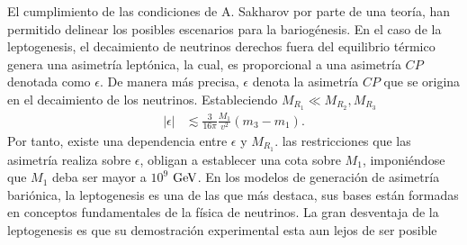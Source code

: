 El cumplimiento de las condiciones de A. Sakharov por parte de una teoría, han permitido delinear los posibles escenarios para la bariogénesis. En el caso de la leptogenesis, el decaimiento de neutrinos derechos fuera del equilibrio térmico genera una asimetría leptónica, la cual, es proporcional a una asimetría $CP$ denotada como $\epsilon$. De manera más precisa, $\epsilon$ denota la asimetría $CP$ que se origina en el decaimiento de los neutrinos.
%
% 
% 
%
Estableciendo $M_{R_{1}}\ll M_{R_{2}},M_{R_{3}}$ 
\begin{align}
|\epsilon|&\lesssim\frac{3}{16\pi}\frac{M_{1}}{v^2}(m_{3}-m_{1}).
\end{align}
 Por tanto, existe una dependencia entre $\epsilon$ y $M_{R_{1}}$. las restricciones que las asimetría realiza sobre $\epsilon$, obligan a establecer una cota sobre $M_{1}$, imponiéndose que $M_{1}$ deba ser mayor a $10^{9}$ $\textup{GeV}$. En los modelos de generación de asimetría bariónica, la leptogenesis es una de las que más destaca, sus bases están formadas en conceptos fundamentales de la física de neutrinos. La gran desventaja de la leptogenesis es que su demostración experimental esta aun lejos de ser posible
